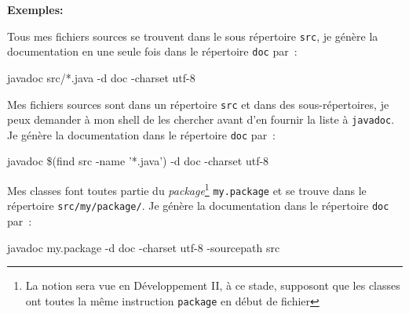 \textbf{Exemples:}

Tous mes fichiers sources se trouvent dans le sous répertoire \texttt{src}, je
génère la documentation en une seule fois dans le répertoire \texttt{doc} par~:

\begin{term}
	javadoc src/*.java -d doc -charset utf-8
\end{term}

Mes fichiers sources sont dans un répertoire \texttt{src} et dans des
sous-répertoires, je peux demander à mon shell de les chercher avant d'en
fournir la liste à \texttt{javadoc}. Je génère la documentation dans le répertoire \texttt{doc} par~:

\begin{term}
	javadoc \$(find src -name '*.java') -d doc -charset utf-8 
\end{term}

Mes classes font toutes partie du \textit{package}\footnote{La notion sera vue en Développement II, à ce stade, supposont que les classes ont toutes la même instruction \texttt{package} en début de fichier} \texttt{my.package} et se trouve dans le répertoire \texttt{src/my/package/}. Je génère la documentation dans le répertoire \texttt{doc} par~:

\begin{term}
javadoc my.package -d doc -charset utf-8 -sourcepath src
\end{term}



